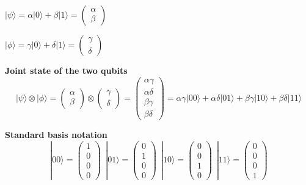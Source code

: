 \documentclass[10pt]{report}
\begin{document}
\begin{list}{}{}
	\item $|\psi\rangle = \alpha|0\rangle+\beta|1\rangle = \left(\begin{array}{c}
	\alpha\\\beta
	\end{array}\right)$
	\item $|\phi\rangle = \gamma|0\rangle+\delta|1\rangle = \left(\begin{array}{c}
	\gamma\\\delta
	\end{array}\right)$
	\item \textbf{Joint state of the two qubits}
	$$|\psi\rangle\otimes|\phi\rangle = \left(\begin{array}{c}
	\alpha\\\beta
	\end{array}\right)\otimes\left(\begin{array}{c}
	\gamma\\\delta
	\end{array}\right) = \left(\begin{array}{c}
	\alpha\gamma\\\alpha\delta\\\beta\gamma\\\beta\delta
	\end{array}\right) = \alpha\gamma|00\rangle + \alpha\delta|01\rangle + \beta\gamma|10\rangle + \beta\delta|11\rangle$$
	\item \textbf{Standard basis notation}
	$$|00\rangle=\left(\begin{array}{c}1\\0\\0\\0\end{array}\right)\:\:|01\rangle=\left(\begin{array}{c}0\\1\\0\\0\end{array}\right)\:\:|10\rangle=\left(\begin{array}{c}0\\0\\1\\0\end{array}\right)\:\:|11\rangle=\left(\begin{array}{c}0\\0\\0\\1\end{array}\right)$$
\end{list}
\end{document}
